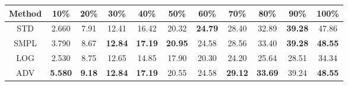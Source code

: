 \documentclass{standalone}
\begin{document}
\begin{tabular}{c|cccccccccc}
      \toprule
      Method & 10\% & 20\% & 30\% & 40\% & 50\% & 60\% & 70\% & 80\% & 90\% & 100\% \\
      \midrule
STD & 2.660 & 7.91 & 12.41 & 16.42 & 20.32 & \textbf{24.79} & 28.40 & 32.89 & \textbf{39.28} & 47.86\\
SMPL & 3.790 & 8.67 & \textbf{12.84} & \textbf{17.19} & \textbf{20.95} & 24.58 & 28.56 & 33.40 & \textbf{39.28} & \textbf{48.55}\\
LOG & 2.530 & 8.75 & 12.65 & 14.85 & 17.90 & 20.30 & 24.20 & 25.64 & 28.51 & 34.34\\
ADV & \textbf{5.580} & \textbf{9.18} & \textbf{12.84} & \textbf{17.19} & 20.55 & 24.58 & \textbf{29.12} & \textbf{33.69} & 39.24 & \textbf{48.55}\\
  \bottomrule
\end{tabular}
\end{document}
